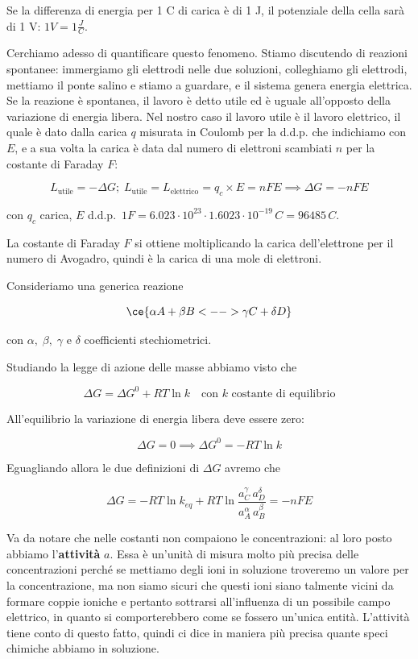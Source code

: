 Se la differenza di energia per 1 C di carica è di 1 J, il potenziale della cella sarà di 1 V: $1 V=1\frac{J}{C}$.

Cerchiamo adesso di quantificare questo fenomeno. Stiamo discutendo di reazioni spontanee: immergiamo gli elettrodi nelle due soluzioni, colleghiamo gli elettrodi, mettiamo il ponte salino e stiamo a guardare, e il sistema genera energia elettrica. Se la reazione è spontanea, il lavoro è detto utile ed è uguale all'opposto della variazione di energia libera. Nel nostro caso il lavoro utile è il lavoro elettrico, il quale è dato dalla carica $q$ misurata in Coulomb per la d.d.p. che indichiamo con $E$, e a sua volta la carica è data dal numero di elettroni scambiati $n$ per la costante di Faraday $F$:

$$L_{\text{utile}}=- \Delta G; \; L_{\text{utile}}=L_{\text{elettrico}}=q_c \times E=nFE \implies \Delta G = -nFE$$

con $q_c$ carica, $E$ d.d.p.\, $1F=6.023 \cdot 10^{23} \cdot 1.6023 \cdot 10^{-19} \, C = 96485 \, C$.

La costante di Faraday $F$ si ottiene moltiplicando la carica dell'elettrone per il numero di Avogadro, quindi è la carica di una mole di elettroni.

Consideriamo una generica reazione

$$\ce{\alpha A + \beta B <--> \gamma C + \delta D}$$

con $\alpha, \; \beta, \; \gamma$ e $\delta$ coefficienti stechiometrici.

Studiando la legge di azione delle masse abbiamo visto che

$$\Delta G = \Delta G^0 + RT\ln k \quad \text{con }k \text{ costante di equilibrio}$$

All'equilibrio la variazione di energia libera deve essere zero:

$$\Delta G=0 \implies \Delta G^0= -RT \ln k$$

Eguagliando allora le due definizioni di $\Delta G$ avremo che

$$\Delta G =  -RT \ln k_{eq} + RT \ln \frac{a_C^{\gamma} \, a_D^{\delta}}{a_A^{\alpha} \, a_B^{\beta}}=-nFE$$

Va da notare che nelle costanti non compaiono le concentrazioni: al loro posto abbiamo l'\textbf{attività} $a$. Essa è un'unità di misura molto più precisa delle concentrazioni perché se mettiamo degli ioni in soluzione troveremo un valore per la concentrazione, ma non siamo sicuri che questi ioni siano talmente vicini da formare coppie ioniche e pertanto sottrarsi all'influenza di un possibile campo elettrico, in quanto si comporterebbero come se fossero un'unica entità. L'attività tiene conto di questo fatto, quindi ci dice in maniera più precisa quante speci chimiche abbiamo in soluzione.

